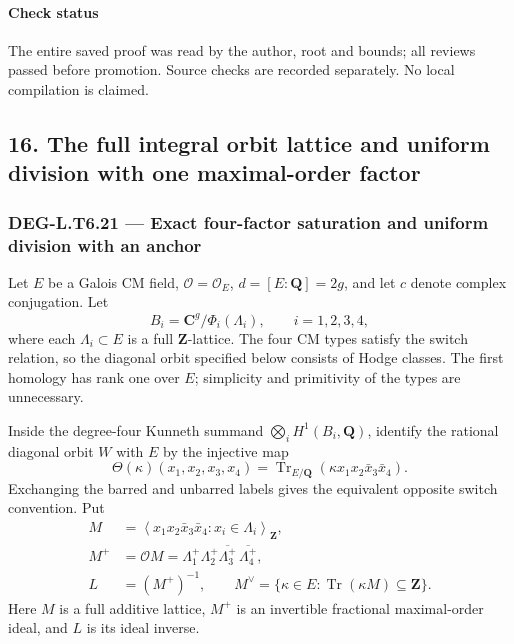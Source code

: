 \documentclass[11pt,a4paper]{article}
\theoremstyle{definition}
\begin{document}
\paragraph{Check status}\label{check-status-1}

The entire saved proof was read by the author, root and bounds; all reviews passed before promotion. Source checks are recorded separately. No local compilation is claimed.

\subsection{16. The full integral orbit lattice and uniform division with one maximal-order factor}\label{the-full-integral-orbit-lattice-and-uniform-division-with-one-maximal-order-factor}

\subsubsection{DEG-L.T6.21 --- Exact four-factor saturation and uniform division with an anchor}\label{DEG-L.T6.21}

Let \(E\) be a Galois CM field, \(\mathcal O=\mathcal O_E\), \(d=[E:\mathbf Q]=2g\), and let \(c\) denote complex conjugation. Let \[
 B_i=\mathbf C^g/\Phi_i(\Lambda_i),\qquad i=1,2,3,4,
\] where each \(\Lambda_i\subset E\) is a full \(\mathbf Z\)-lattice. The four CM types satisfy the switch relation, so the diagonal orbit specified below consists of Hodge classes. The first homology has rank one over \(E\); simplicity and primitivity of the types are unnecessary.

Inside the degree-four Kunneth summand \(\bigotimes_i H^1(B_i,\mathbf Q)\), identify the rational diagonal orbit \(W\) with \(E\) by the injective map \[
 \Theta(\kappa)(x_1,x_2,x_3,x_4)
   =\operatorname{Tr}_{E/\mathbf Q}
       (\kappa x_1x_2\bar x_3\bar x_4).
 \tag{T21.1}
\] Exchanging the barred and unbarred labels gives the equivalent opposite switch convention. Put \[
 \begin{aligned}
 M&=\left\langle x_1x_2\bar x_3\bar x_4:
                         x_i\in\Lambda_i\right\rangle_{\mathbf Z},\\
 M^+&=\mathcal O M
   =\Lambda_1^+\Lambda_2^+\overline{\Lambda_3^+}\,
                                  \overline{\Lambda_4^+},\\
 L&=(M^+)^{-1},\qquad
 M^\vee=\{\kappa\in E:\operatorname{Tr}(\kappa M)\subseteq\mathbf Z\}.
 \end{aligned}
 \tag{T21.2}
\] Here \(M\) is a full additive lattice, \(M^+\) is an invertible fractional maximal-order ideal, and \(L\) is its ideal inverse.
\end{document}
